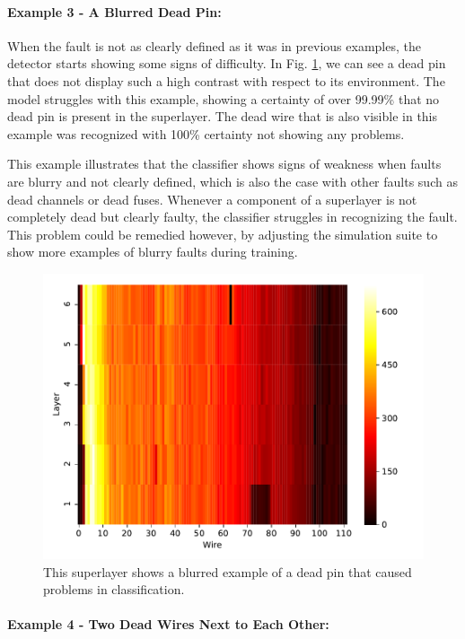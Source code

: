 \paragraph{Example 3 - A Blurred Dead Pin:}

When the fault is not as clearly defined as it was in previous
examples, the detector starts showing some signs of
difficulty. In Fig. \ref{fig:pin-failure}, we can see a dead pin that
does not display such a high contrast with respect to its environment.
The model struggles with this example, showing a certainty of over
99.99\% that no dead pin is present in the superlayer. The dead wire
that is also visible in this example was recognized with 100\%
certainty not showing any problems.

This example illustrates that the classifier shows signs of weakness
when faults are blurry and not clearly defined, which is
also the case with other faults such as dead channels or dead
fuses. Whenever a component of a superlayer is not completely dead but
clearly faulty, the classifier struggles in recognizing the
fault. This problem could be remedied however, by adjusting the
simulation suite to show more examples of blurry faults during
training.

\begin{figure}
  \includegraphics[width=\textwidth]{../figures/small_pin_fail}
  \caption{This superlayer shows a blurred example of a dead pin that
    caused problems in classification.}
  \label{fig:pin-failure}
\end{figure}

\paragraph{Example 4 - Two Dead Wires Next to Each Other:}

